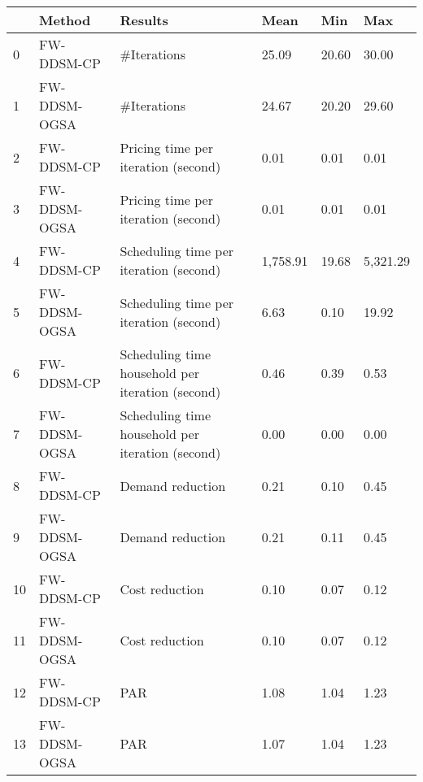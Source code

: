 \begin{tabular}{llllll}
\toprule
{} &        Method &                                           Results &      Mean &    Min &       Max \\
\midrule
0  &    FW-DDSM-CP &                                       \#Iterations &     25.09 &  20.60 &     30.00 \\
1  &  FW-DDSM-OGSA &                                       \#Iterations &     24.67 &  20.20 &     29.60 \\
2  &    FW-DDSM-CP &               Pricing time per iteration (second) &      0.01 &   0.01 &      0.01 \\
3  &  FW-DDSM-OGSA &               Pricing time per iteration (second) &      0.01 &   0.01 &      0.01 \\
4  &    FW-DDSM-CP &            Scheduling time per iteration (second) &  1,758.91 &  19.68 &  5,321.29 \\
5  &  FW-DDSM-OGSA &            Scheduling time per iteration (second) &      6.63 &   0.10 &     19.92 \\
6  &    FW-DDSM-CP &  Scheduling time household per iteration (second) &      0.46 &   0.39 &      0.53 \\
7  &  FW-DDSM-OGSA &  Scheduling time household per iteration (second) &      0.00 &   0.00 &      0.00 \\
8  &    FW-DDSM-CP &                                  Demand reduction &      0.21 &   0.10 &      0.45 \\
9  &  FW-DDSM-OGSA &                                  Demand reduction &      0.21 &   0.11 &      0.45 \\
10 &    FW-DDSM-CP &                                    Cost reduction &      0.10 &   0.07 &      0.12 \\
11 &  FW-DDSM-OGSA &                                    Cost reduction &      0.10 &   0.07 &      0.12 \\
12 &    FW-DDSM-CP &                                               PAR &      1.08 &   1.04 &      1.23 \\
13 &  FW-DDSM-OGSA &                                               PAR &      1.07 &   1.04 &      1.23 \\
\bottomrule
\end{tabular}
